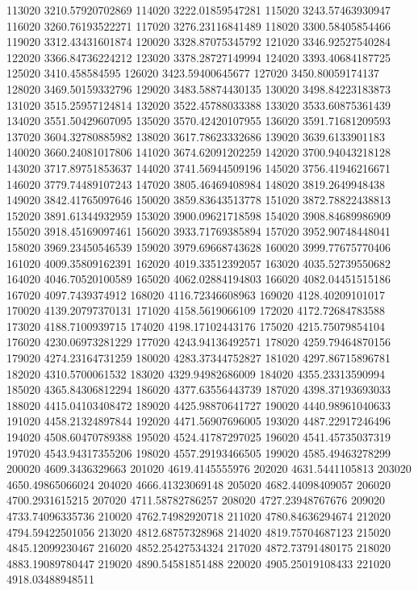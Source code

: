 {113020 3210.57920702869
114020 3222.01859547281
115020 3243.57463930947
116020 3260.76193522271
117020 3276.23116841489
118020 3300.58405854466
119020 3312.43431601874
120020 3328.87075345792
121020 3346.92527540284
122020 3366.84736224212
123020 3378.28727149994
124020 3393.40684187725
125020 3410.458584595
126020 3423.59400645677
127020 3450.80059174137
128020 3469.50159332796
129020 3483.58874430135
130020 3498.84223183873
131020 3515.25957124814
132020 3522.45788033388
133020 3533.60875361439
134020 3551.50429607095
135020 3570.42420107955
136020 3591.71681209593
137020 3604.32780885982
138020 3617.78623332686
139020 3639.6133901183
140020 3660.24081017806
141020 3674.62091202259
142020 3700.94043218128
143020 3717.89751853637
144020 3741.56944509196
145020 3756.41946216671
146020 3779.74489107243
147020 3805.46469408984
148020 3819.2649948438
149020 3842.41765097646
150020 3859.83643513778
151020 3872.78822438813
152020 3891.61344932959
153020 3900.09621718598
154020 3908.84689986909
155020 3918.45169097461
156020 3933.71769385894
157020 3952.90748448041
158020 3969.23450546539
159020 3979.69668743628
160020 3999.77675770406
161020 4009.35809162391
162020 4019.33512392057
163020 4035.52739550682
164020 4046.70520100589
165020 4062.02884194803
166020 4082.04451515186
167020 4097.7439374912
168020 4116.72346608963
169020 4128.40209101017
170020 4139.20797370131
171020 4158.5619066109
172020 4172.72684783588
173020 4188.7100939715
174020 4198.17102443176
175020 4215.75079854104
176020 4230.06973281229
177020 4243.94136492571
178020 4259.79464870156
179020 4274.23164731259
180020 4283.37344752827
181020 4297.86715896781
182020 4310.5700061532
183020 4329.94982686009
184020 4355.23313590994
185020 4365.84306812294
186020 4377.63556443739
187020 4398.37193693033
188020 4415.04103408472
189020 4425.98870641727
190020 4440.98961040633
191020 4458.21324897844
192020 4471.56907696005
193020 4487.22917246496
194020 4508.60470789388
195020 4524.41787297025
196020 4541.45735037319
197020 4543.94317355206
198020 4557.29193466505
199020 4585.49463278299
200020 4609.3436329663
201020 4619.4145555976
202020 4631.5441105813
203020 4650.49865066024
204020 4666.41323069148
205020 4682.44098409057
206020 4700.2931615215
207020 4711.58782786257
208020 4727.23948767676
209020 4733.74096335736
210020 4762.74982920718
211020 4780.84636294674
212020 4794.59422501056
213020 4812.68757328968
214020 4819.75704687123
215020 4845.12099230467
216020 4852.25427534324
217020 4872.73791480175
218020 4883.19089780447
219020 4890.54581851488
220020 4905.25019108433
221020 4918.03488948511
}
